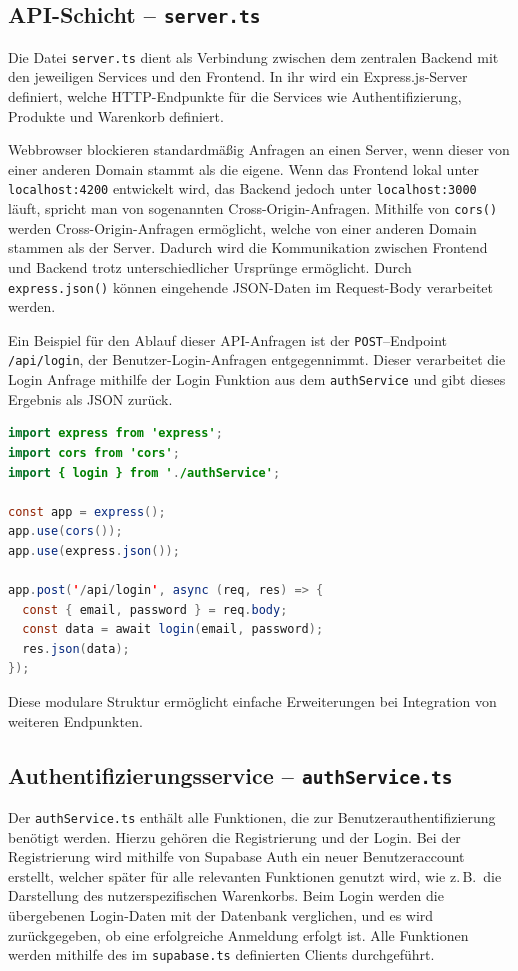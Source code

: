 \documentclass[oneside]{ausarbeitung}
\begin{document}
\subsection{API-Schicht – \texttt{server.ts}}

Die Datei \texttt{server.ts} dient als Verbindung zwischen dem zentralen Backend mit den jeweiligen Services und den Frontend. In ihr wird ein Express.js-Server definiert, welche HTTP-Endpunkte für die Services wie Authentifizierung, Produkte und Warenkorb definiert.

Webbrowser blockieren standardmäßig Anfragen an einen Server, wenn dieser von einer anderen Domain stammt als die eigene. Wenn das Frontend lokal unter \texttt{localhost:4200} entwickelt wird, das Backend jedoch unter \texttt{localhost:3000} läuft, spricht man von sogenannten Cross-Origin-Anfragen.
Mithilfe von \texttt{cors()} werden Cross-Origin-Anfragen ermöglicht, welche von einer anderen Domain stammen als der Server. Dadurch wird die Kommunikation zwischen Frontend und Backend trotz unterschiedlicher Ursprünge ermöglicht.
Durch \texttt{express.json()} können eingehende JSON-Daten im Request-Body verarbeitet werden.

Ein Beispiel für den Ablauf dieser API-Anfragen ist der \texttt{POST}–Endpoint \texttt{/api/login}, der Benutzer-Login-Anfragen entgegennimmt. Dieser verarbeitet die Login Anfrage mithilfe der Login Funktion aus dem \texttt{authService} und gibt dieses Ergebnis als JSON zurück. 


\begin{lstlisting}[language=Java, caption={Auszug aus \texttt{server.ts}}]
import express from 'express';
import cors from 'cors';
import { login } from './authService';

const app = express();
app.use(cors());
app.use(express.json());

app.post('/api/login', async (req, res) => {
  const { email, password } = req.body;
  const data = await login(email, password);
  res.json(data);
});
\end{lstlisting}

Diese modulare Struktur ermöglicht einfache Erweiterungen bei Integration von weiteren Endpunkten. 

\subsection{Authentifizierungsservice – \texttt{authService.ts}}

Der \texttt{authService.ts} enthält alle Funktionen, die zur Benutzerauthentifizierung benötigt werden. Hierzu gehören die Registrierung und der Login. Bei der Registrierung wird mithilfe von Supabase Auth ein neuer Benutzeraccount erstellt, welcher später für alle relevanten Funktionen genutzt wird, wie z.\,B.\ die Darstellung des nutzerspezifischen Warenkorbs. Beim Login werden die übergebenen Login-Daten mit der Datenbank verglichen, und es wird zurückgegeben, ob eine erfolgreiche Anmeldung erfolgt ist.
Alle Funktionen werden mithilfe des im \texttt{supabase.ts} definierten Clients durchgeführt.
\end{document}
